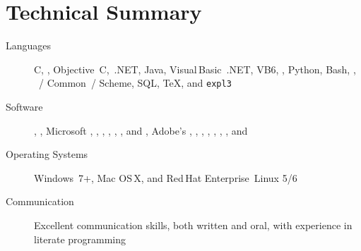 \documentclass{simplecv}
\begin{document}
\maketitle
\vfill
 \vfill \vfill
\section{Technical Summary}
\begin{minipage}{\textwidth}
\begin{description}
\item[Languages]
  C,
  \CPP,
  Objective~C,
  \CSharp\,.NET,
  Java,
  Visual\,Basic~.NET,
  VB6,
  ,
  Python,
  Bash,
  ,
  ~\Lisp\slash
            Common~\Lisp\slash
            Scheme,
  SQL,
  \TeX,
  and
  \texttt{expl3}

\item[Software]
  ,
  ,
  Microsoft ,
            ,
            ,
            ,
            ,
            ,
            and
            ,
  Adobe's
    ,
    ,
    ,
  ,
  ,
  ,
  ,
  and

\item[Operating Systems]
  Windows~7+,
  Mac OS\,X,
  and
  Red\,Hat Enterprise~Linux 5\slash 6

\item[Communication]
  Excellent communication skills, both written and oral,
    with experience in literate programming
\end{description}
\end{minipage}

\vfill\vfill
\end{document}
